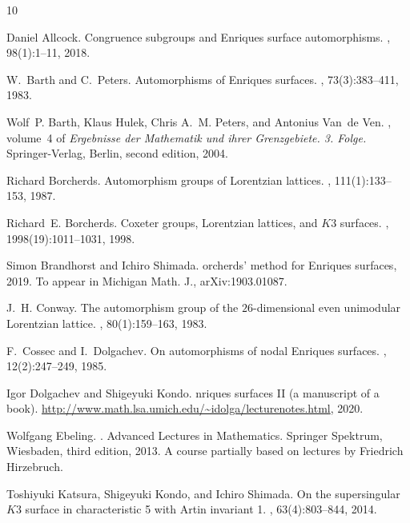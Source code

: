 \documentclass{amsart}
\numberwithin{procedure}{section}
\begin{document}
\begin{thebibliography}{10}

Daniel Allcock.
\newblock Congruence subgroups and {E}nriques surface automorphisms.
, 98(1):1--11, 2018.

W.~Barth and C.~Peters.
\newblock Automorphisms of {E}nriques surfaces.
, 73(3):383--411, 1983.

Wolf~P. Barth, Klaus Hulek, Chris A.~M. Peters, and Antonius Van~de Ven.
, volume~4 of {\em Ergebnisse der
  Mathematik und ihrer Grenzgebiete. 3. Folge.}
\newblock Springer-Verlag, Berlin, second edition, 2004.

Richard Borcherds.
\newblock Automorphism groups of {L}orentzian lattices.
, 111(1):133--153, 1987.

Richard~E. Borcherds.
\newblock Coxeter groups, {L}orentzian lattices, and {$K3$} surfaces.
, 1998(19):1011--1031, 1998.

Simon Brandhorst and Ichiro Shimada.
orcherds' method for {E}nriques surfaces, 2019.
\newblock To appear in Michigan Math. J., ar{X}iv:1903.01087.

J.~H. Conway.
\newblock The automorphism group of the {$26$}-dimensional even unimodular
  {L}orentzian lattice.
, 80(1):159--163, 1983.

F.~Cossec and I.~Dolgachev.
\newblock On automorphisms of nodal {E}nriques surfaces.
, 12(2):247--249, 1985.

Igor Dolgachev and Shigeyuki Kondo.
nriques surfaces {II} (a manuscript of a book).
\newblock \url{http://www.math.lsa.umich.edu/~idolga/lecturenotes.html}, 2020.

Wolfgang Ebeling.
.
\newblock Advanced Lectures in Mathematics. Springer Spektrum, Wiesbaden, third
  edition, 2013.
\newblock A course partially based on lectures by Friedrich Hirzebruch.

Toshiyuki Katsura, Shigeyuki Kondo, and Ichiro Shimada.
\newblock On the supersingular {$K3$} surface in characteristic 5 with {A}rtin
  invariant 1.
, 63(4):803--844, 2014.


\end{thebibliography}
\end{document}

